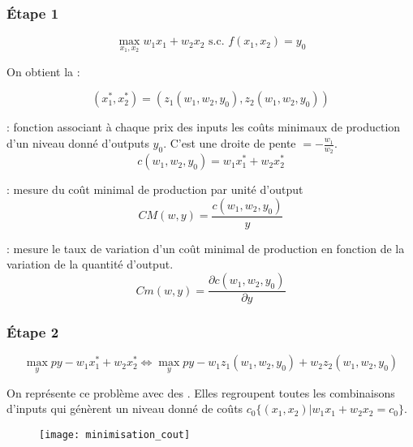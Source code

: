\subsubsection{Étape 1}
\begin{equation*}
\max_{x_1, x_2} w_1 x_1 + w_2 x_2 \text{ s.c. } f(x_1, x_2) = y_0
\end{equation*}

On obtient la  :

\begin{equation*}
(x_1^*, x_2^*) = (z_1(w_1,w_2,y_0),z_2(w_1,w_2,y_0))
\end{equation*}

 : fonction associant à chaque prix des inputs les coûts minimaux de production d'un niveau donné d'outputs $y_0$. C'est une droite de pente $= -\frac{w_1}{w_2}$.
\begin{equation*}
c(w_1, w_2, y_0) = w_1x^*_1 + w_2x^*_2
\end{equation*}

 : mesure du coût minimal de production par unité d'output
\begin{equation*}
CM(w,y) = \frac{c(w_1, w_2, y_0)}{y}
\end{equation*}

 : mesure le taux de variation d'un coût minimal de production en fonction de la variation de la quantité d'output.
\begin{equation*}
Cm(w,y) = \frac{\partial c(w_1, w_2, y_0)}{\partial y}
\end{equation*}

\subsubsection{Étape 2}

\begin{equation*}
\max_y py - w_1x^*_1 + w_2x^*_2 \Longleftrightarrow \max_y py - w_1z_1(w_1,w_2,y_0) + w_2 z_2 (w_1, w_2, y_0)
\end{equation*}

On représente ce problème avec des . Elles regroupent toutes les combinaisons d'inputs qui génèrent un niveau donné de coûts $c_0 \{(x_1, x_2)|w_1x_1 + w_2x_2 = c_0\}$.

\begin{figure}[H]
	\centering
	\texttt{[image: minimisation\_cout]}
\end{figure}

